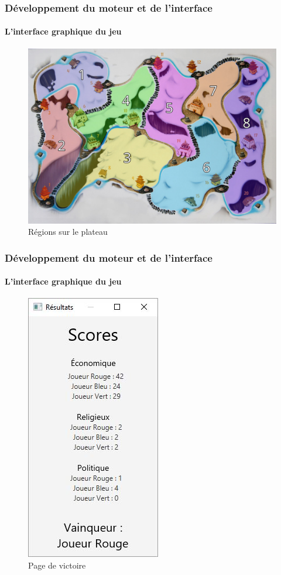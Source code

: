 	\begin{frame}
		\frametitle{Développement du moteur et de l'interface}
		\framesubtitle{L'interface graphique du jeu}
		\begin{figure}[h]
			\centering
			\includegraphics[width=0.8\linewidth]{images/board_regions}
			\caption{Régions sur le plateau}
			\label{fig:regions}
		\end{figure}
	\end{frame}

	\begin{frame}
		\frametitle{Développement du moteur et de l'interface}
		\framesubtitle{L'interface graphique du jeu}
		\begin{figure}[h]
			\centering
			\includegraphics[width=0.25\linewidth]{images/resultats}
			\caption{Page de victoire}
			\label{fig:victoire}
		\end{figure}
	\end{frame}



	

